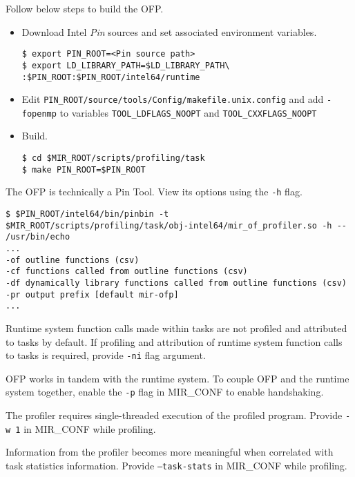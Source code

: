 \documentclass[11pt,a4paper]{article}
\begin{document}
Follow below steps to build the OFP.

\begin{itemize}
    \item Download Intel \textit{Pin} sources and set associated environment variables.

\begin{lstlisting}[style=MyInputStyle]
$ export PIN_ROOT=<Pin source path>
$ export LD_LIBRARY_PATH=$LD_LIBRARY_PATH\
:$PIN_ROOT:$PIN_ROOT/intel64/runtime
\end{lstlisting}

    \item Edit \texttt{PIN\_ROOT/source/tools/Config/makefile.unix.config} and add \texttt{-fopenmp} to variables \texttt{TOOL\_LDFLAGS\_NOOPT}  and \texttt{TOOL\_CXXFLAGS\_NOOPT}

    \item Build.

\begin{lstlisting}[style=MyInputStyle]
$ cd $MIR_ROOT/scripts/profiling/task
$ make PIN_ROOT=$PIN_ROOT
\end{lstlisting}
\end{itemize}

The OFP is technically a Pin Tool. View its options using the \texttt{-h} flag.

\begin{lstlisting}[style=MyInputStyle]
$ $PIN_ROOT/intel64/bin/pinbin -t $MIR_ROOT/scripts/profiling/task/obj-intel64/mir_of_profiler.so -h -- /usr/bin/echo
...
-of outline functions (csv)
-cf functions called from outline functions (csv)
-df dynamically library functions called from outline functions (csv)
-pr output prefix [default mir-ofp]
...
\end{lstlisting}

Runtime system function calls made within tasks are not profiled and attributed to tasks by default.
If profiling and attribution of runtime system function calls to tasks is required, provide \texttt{-ni} flag argument.

OFP works in tandem with the runtime system. To couple OFP and the runtime system together, enable the \texttt{-p} flag in MIR\_CONF to enable handshaking.

The profiler requires single-threaded execution of the profiled program. Provide \texttt{-w 1} in MIR\_CONF while profiling.

Information from the profiler becomes more meaningful when correlated with task statistics information. Provide \texttt{--task-stats} in MIR\_CONF while profiling.
\end{document}
